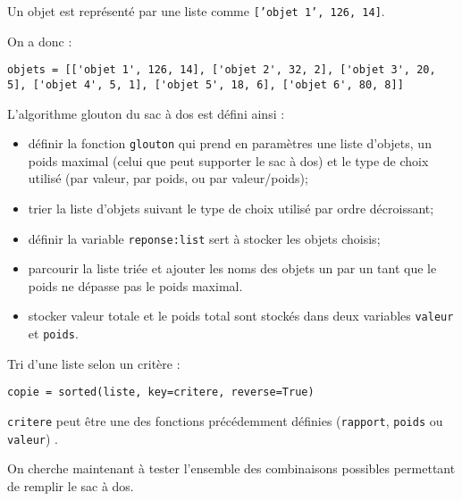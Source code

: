 Un objet est représenté par une liste comme \texttt{['objet 1', 126, 14]}.

On a donc : 
\begin{lstlisting}	
objets = [['objet 1', 126, 14], ['objet 2', 32, 2], ['objet 3', 20, 5], ['objet 4', 5, 1], ['objet 5', 18, 6], ['objet 6', 80, 8]]
\end{lstlisting}




L'algorithme glouton du sac à dos est défini ainsi : 
\begin{itemize}
\item définir la fonction \texttt{glouton} qui prend en paramètres une liste d’objets, un poids maximal (celui que peut supporter le sac à dos) et le type de choix utilisé (par valeur, par poids, ou par valeur/poids);
\item trier la liste d'objets suivant le type de choix utilisé par ordre décroissant;
\item définir la variable \texttt{reponse:list} sert à stocker les objets choisis;
\item parcourir la liste triée et ajouter les noms des objets un par un tant que le poids ne dépasse pas le poids maximal. 
\item stocker valeur totale et le poids total sont stockés dans deux variables \texttt{valeur} et \texttt{poids}.
\end{itemize}

\begin{rem}
Tri d'une liste selon un critère : 
\begin{lstlisting}
copie = sorted(liste, key=critere, reverse=True)
\end{lstlisting}
\texttt{critere} peut être une des fonctions précédemment définies (\texttt{rapport}, \texttt{poids} ou \texttt{valeur}) .
\end{rem}




On cherche maintenant à tester l'ensemble des combinaisons possibles permettant de remplir le sac à dos. 


